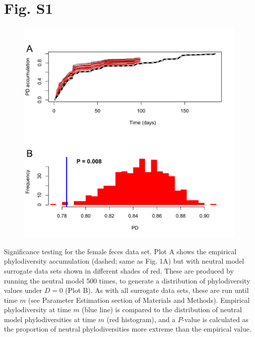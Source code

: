 \documentclass{article}
\begin{document}
%
%
\section*{Fig. S1}
\begin{figure}[ht]
	\centering
	\includegraphics[scale=0.80]{../Fig_S1.pdf}
\end{figure}
Significance testing for the female feces data set. Plot A shows the empirical phylodiversity accumulation (dashed; same as Fig. 1A) but with neutral model surrogate data sets shown in different shades of red. These are produced by running the neutral model 500 times, to generate a distribution of phylodiversity values under \(D = 0\) (Plot B). As with all surrogate data sets, these are run until time \(m\) (see Parameter Estimation section of Materials and Methods). Empirical phylodiversity at time \(m\) (blue line) is compared to the distribution of neutral model phylodiversities at time \(m\) (red histogram), and a \(P\)-value is calculated as the proportion of neutral phylodiversities more extreme than the empirical value. 
\newpage
%
%
\end{document}
